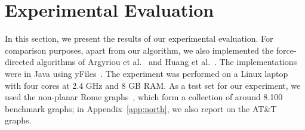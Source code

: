\documentclass[runningheads]{llncs}
\begin{document}


\section{Experimental Evaluation}
\label{sec:experiments}

In this section, we present the results of our experimental evaluation. For comparison purposes, apart from our algorithm, we also implemented the force-directed algorithms of Argyriou et al.~\cite{DBLP:journals/cj/ArgyriouBS13} and Huang et al.~\cite{DBLP:journals/vlc/HuangEHL13}. The implementations were in Java using yFiles~\cite{DBLP:books/sp/04/WieseE004}. The experiment was performed on a Linux laptop with four cores at 2.4 GHz and 8 GB RAM.
%
As a test set for our experiment, we used the non-planar Rome graphs~\cite{DBLP:reference/crc/BattistaD13}, which form a collection of around 8.100 benchmark graphs; in Appendix~\ref{app:north}, we also report on the AT\&T graphs.
\end{document}
